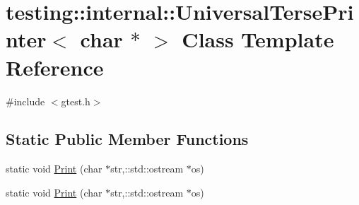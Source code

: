 \hypertarget{classtesting_1_1internal_1_1_universal_terse_printer_3_01char_01_5_01_4}{\section{testing\-:\-:internal\-:\-:Universal\-Terse\-Printer$<$ char $\ast$ $>$ Class Template Reference}
\label{classtesting_1_1internal_1_1_universal_terse_printer_3_01char_01_5_01_4}
}


{\ttfamily \#include $<$gtest.\-h$>$}

\subsection*{Static Public Member Functions}
\begin{DoxyCompactItemize}
\item 
static void \hyperlink{classtesting_1_1internal_1_1_universal_terse_printer_3_01char_01_5_01_4_a88c426f4af279251b4f4a02cd55ab57c}{Print} (char $\ast$str,\-::std\-::ostream $\ast$os)
\item 
static void \hyperlink{classtesting_1_1internal_1_1_universal_terse_printer_3_01char_01_5_01_4_a88c426f4af279251b4f4a02cd55ab57c}{Print} (char $\ast$str,\-::std\-::ostream $\ast$os)
\end{DoxyCompactItemize}


